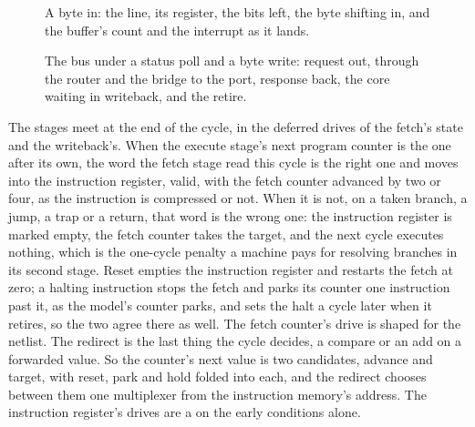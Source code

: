 \documentclass[journal,onecolumn,9pt]{IEEEtran}
\begin{document}
\begin{figure}[htbp]
\centering

\caption{A byte in: the line, its register, the bits left, the byte
shifting in, and the buffer's count and the interrupt as it lands.}
\label{fig:v-in}
\end{figure}

\begin{figure}[htbp]
\centering

\caption{The bus under a status poll and a byte write: request out,
through the router and the bridge to the port, response back, the
core waiting in writeback, and the retire.}
\label{fig:v-bus}
\end{figure}





The stages meet at the end of the cycle, in the deferred drives of
the fetch's state and the writeback's. When the execute stage's next
program counter is the one after its own, the word the fetch stage
read this cycle is the right one and moves into the instruction
register, valid, with the fetch counter advanced by two or four, as
the instruction is compressed or not. When it is
not, on a taken branch, a jump, a trap or a return, that word is the
wrong one: the instruction register is marked empty, the fetch
counter takes the target, and the next cycle executes nothing, which
is the one-cycle penalty a machine pays for resolving branches in
its second stage. Reset empties the instruction register and
restarts the fetch at zero; a halting instruction stops the fetch
and parks its counter one instruction past it, as the model's
counter parks, and
sets the halt a cycle later when it retires, so the two agree there
as well. The fetch counter's drive is shaped for the netlist. The
redirect is the last thing the cycle decides, a compare or an add on
a forwarded value. So the counter's next value is two candidates,
advance and target, with reset, park and hold folded into each, and
the redirect chooses between them one multiplexer from the
instruction memory's address. The instruction register's drives are
a  on the early conditions alone.
\end{document}
